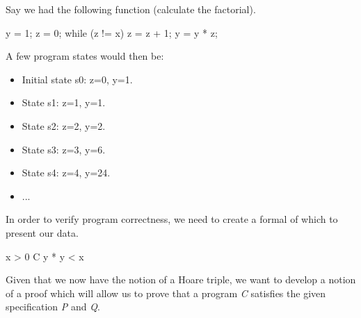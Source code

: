 Say we had the following function (calculate the factorial).\\
\begin{code}[C]
y = 1;
z = 0;
while (z != x) {
		z = z + 1;
		y = y * z;
}
\end{code}

A few program states would then be:\\
\begin{itemize}
\item Initial state s0: z=0, y=1.
\item State s1: z=1, y=1.
\item State s2: z=2, y=2.
\item State s3: z=3, y=6.
\item State s4: z=4, y=24.
\item ...
\end{itemize}

In order to verify program correctness, we need to create a formal of which to present our data.



\begin{code}[C]
{x > 0} C { y * y < x}
\end{code}


Given that we now have the notion of a Hoare triple, we want to develop a notion of a proof which will allow us to prove that a program \emph{C} satisfies the given specification \emph{P} and \emph{Q}.\\


